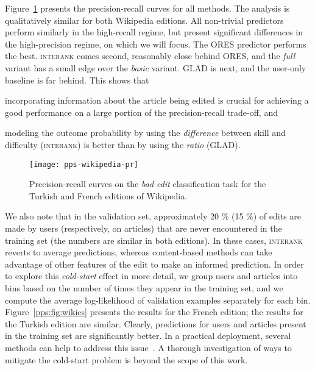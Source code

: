Figure~\ref{pps:fig:wikipr} presents the precision-recall curves for all methods.
The analysis is qualitatively similar for both Wikipedia editions.
All non-trivial predictors perform similarly in the high-recall regime, but present significant differences in the high-precision regime, on which we will focus.
The ORES predictor performs the best.
\textsc{interank} comes second, reasonably close behind ORES, and the \emph{full} variant has a small edge over the \emph{basic} variant.
GLAD is next, and the user-only baseline is far behind.
This shows that
\begin{enuminline}
	\item incorporating information about the article being edited is crucial for achieving a good performance on a large portion of the precision-recall trade-off, and
	\item modeling the outcome probability by using the \emph{difference} between skill and difficulty (\textsc{interank}) is better than by using the \emph{ratio} (GLAD).
\end{enuminline}

\begin{figure}
	\centering
	\texttt{[image: pps-wikipedia-pr]}
	\caption{Precision-recall curves on the \emph{bad edit} classification task for the Turkish and French editions of Wikipedia.}
	\label{pps:fig:wikipr}
\end{figure}

We also note that in the validation set, approximately \num{20} \% (\num{15} \%) of edits are made by users (respectively, on articles) that are never encountered in the training set (the numbers are similar in both editions).
In these cases, \textsc{interank} reverts to average predictions, whereas content-based methods can take advantage of other features of the edit to make an informed prediction.
In order to explore this \emph{cold-start} effect in more detail, we group users and articles into bins based on the number of times they appear in the training set, and we compute the average log-likelihood of validation examples separately for each bin.
Figure~\ref{pps:fig:wikics} presents the results for the French edition;
the results for the Turkish edition are similar.
Clearly, predictions for users and articles present in the training set are significantly better.
In a practical deployment, several methods can help to address this issue~\citep{schein2002methods, lam2008addressing, levi2012finding}.
A thorough investigation of ways to mitigate the cold-start problem is beyond the scope of this work.

